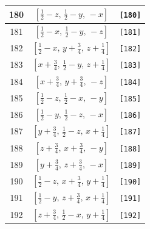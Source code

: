 \documentclass[fleqn,8pt]{jsarticle}
\begin{document}
\begin{longtable}{ccc}
180 & $\left[ \frac{1}{2} - z,\, \frac{1}{2} - y,\, - x \right]$ & {\tt [180]} \\ \hline
181 & $\left[ \frac{1}{2} - x,\, \frac{1}{2} - y,\, - z \right]$ & {\tt [181]} \\ \hline
182 & $\left[ \frac{1}{2} - x,\, y + \frac{3}{4},\, z + \frac{1}{4} \right]$ & {\tt [182]} \\ \hline
183 & $\left[ x + \frac{3}{4},\, \frac{1}{2} - y,\, z + \frac{1}{4} \right]$ & {\tt [183]} \\ \hline
184 & $\left[ x + \frac{3}{4},\, y + \frac{3}{4},\, - z \right]$ & {\tt [184]} \\ \hline
185 & $\left[ \frac{1}{2} - z,\, \frac{1}{2} - x,\, - y \right]$ & {\tt [185]} \\ \hline
186 & $\left[ \frac{1}{2} - y,\, \frac{1}{2} - z,\, - x \right]$ & {\tt [186]} \\ \hline
187 & $\left[ y + \frac{3}{4},\, \frac{1}{2} - z,\, x + \frac{1}{4} \right]$ & {\tt [187]} \\ \hline
188 & $\left[ z + \frac{3}{4},\, x + \frac{3}{4},\, - y \right]$ & {\tt [188]} \\ \hline
189 & $\left[ y + \frac{3}{4},\, z + \frac{3}{4},\, - x \right]$ & {\tt [189]} \\ \hline
190 & $\left[ \frac{1}{2} - z,\, x + \frac{3}{4},\, y + \frac{1}{4} \right]$ & {\tt [190]} \\ \hline
191 & $\left[ \frac{1}{2} - y,\, z + \frac{3}{4},\, x + \frac{1}{4} \right]$ & {\tt [191]} \\ \hline
192 & $\left[ z + \frac{3}{4},\, \frac{1}{2} - x,\, y + \frac{1}{4} \right]$ & {\tt [192]} \\
\end{longtable}
\end{document}

